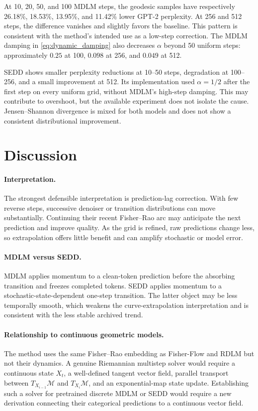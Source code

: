 \documentclass[10pt]{article}
\begin{document}
At 10, 20, 50, and 100 MDLM steps, the geodesic samples have respectively 26.18\%, 18.53\%,
13.95\%, and 11.42\% lower GPT-2 perplexity.  At 256 and 512 steps, the difference vanishes and slightly
favors the baseline.  This pattern is consistent with the method's intended use as a low-step correction.
The MDLM damping in
\cref{eq:dynamic_damping} also decreases $\alpha$ beyond 50 uniform steps: approximately $0.25$ at
100, $0.098$ at 256, and $0.049$ at 512.

SEDD shows smaller perplexity reductions at 10--50 steps, degradation at 100--256, and a small
improvement at 512.  Its implementation used $\alpha=1/2$ after the first step on every uniform
grid, without MDLM's high-step damping.  This may contribute to overshoot, but the available experiment
does not isolate the cause.  Jensen--Shannon divergence is mixed for both models and does not show a
consistent distributional improvement.

\section{Discussion}

\paragraph{Interpretation.}
The strongest defensible interpretation is prediction-lag correction.  With few reverse steps, successive
denoiser or transition distributions can move substantially.  Continuing their recent Fisher--Rao arc may
anticipate the next prediction and improve quality.  As the grid is refined, raw predictions change less,
so extrapolation offers little benefit and can amplify stochastic or model error.

\paragraph{MDLM versus SEDD.}
MDLM applies momentum to a clean-token prediction before the absorbing transition and freezes completed
tokens.  SEDD applies momentum to a stochastic-state-dependent one-step transition.  The latter object may
be less temporally smooth, which weakens the curve-extrapolation interpretation and is consistent with the
less stable archived trend.

\paragraph{Relationship to continuous geometric models.}
The method uses the same Fisher--Rao embedding as Fisher-Flow and RDLM but not their dynamics.  A genuine
Riemannian multistep solver would require a continuous state $X_t$, a well-defined tangent vector field,
parallel transport between $T_{X_{i-1}}\mathcal{M}$ and $T_{X_i}\mathcal{M}$, and an exponential-map state
update.  Establishing such a solver for pretrained discrete MDLM or SEDD would require a new derivation
connecting their categorical predictions to a continuous vector field.
\end{document}
